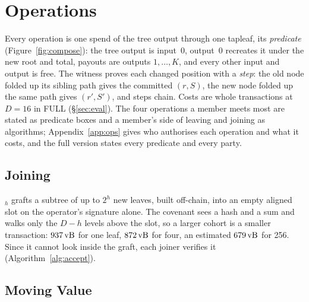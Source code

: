 \section{Operations}\label{sec:ops}

Every operation is one spend of the tree output through one tapleaf, its
\emph{predicate} (Figure~\ref{fig:compose}): the tree output is input~0,
output~0 recreates it under the new root and total, payouts are outputs
$1, \dots, K$, and every other input and output is free. The witness
proves each changed position with a \emph{step}: the old node folded up
its sibling path gives the committed $(r, S)$, the new node folded up the
same path gives $(r', S')$, and steps chain. Costs are whole transactions
at $D = 16$ in FULL (\S\ref{sec:eval}). The four operations a member meets
most are stated as predicate boxes and a member's side of leaving and
joining as algorithms; Appendix~\ref{app:ops} gives who authorises each
operation and what it costs, and the full version states every predicate
and every party.

\predNotation


\subsection{Joining}\label{sec:parties}

$_h$ grafts a subtree of up to $2^h$ new leaves, built off-chain,
into an empty aligned slot on the operator's signature alone. The covenant
sees a hash and a sum and walks only the $D - h$ levels above the slot, so
a larger cohort is a smaller transaction: $937\,\mathrm{vB}$ for one leaf, $872\,\mathrm{vB}$
for four, an estimated $679\,\mathrm{vB}$ for 256. Since it cannot look inside the
graft, each joiner verifies it (Algorithm~\ref{alg:accept}).

\predJoin
\algAccept

\subsection{Moving Value}


